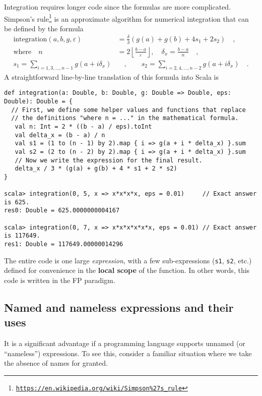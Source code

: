 Integration requires longer code since the formulas are more complicated.
Simpson's rule\footnote{\texttt{\href{https://en.wikipedia.org/wiki/Simpson\%27s_rule}{https://en.wikipedia.org/wiki/Simpson\%27s\_rule}}}
is an approximate algorithm for numerical integration that can be
defined by the formula
\begin{align*}
\text{integration}\left(a,b,g,\varepsilon\right) & =\frac{\delta}{3}\left(g(a)+g(b)+4s_{1}+2s_{2}\right)\quad,\\
\text{where }~~~n & =2\left\lfloor \frac{b-a}{\varepsilon}\right\rfloor ,\quad\delta_{x}=\frac{b-a}{n}\quad,\\
s_{1}=\sum_{i=1,3,...,n-1}g(a+i\delta_{x}) & \quad,\quad\quad s_{2}=\sum_{i=2,4,...,n-2}g(a+i\delta_{x})\quad.
\end{align*}
 A straightforward line-by-line translation of this formula into Scala
is
\begin{lstlisting}
def integration(a: Double, b: Double, g: Double => Double, eps: Double): Double = {
  // First, we define some helper values and functions that replace
  // the definitions "where n = ..." in the mathematical formula.
   val n: Int = 2 * ((b - a) / eps).toInt
   val delta_x = (b - a) / n
   val s1 = (1 to (n - 1) by 2).map { i => g(a + i * delta_x) }.sum
   val s2 = (2 to (n - 2) by 2).map { i => g(a + i * delta_x) }.sum
   // Now we write the expression for the final result.
   delta_x / 3 * (g(a) + g(b) + 4 * s1 + 2 * s2)
}

scala> integration(0, 5, x => x*x*x*x, eps = 0.01)     // Exact answer is 625.
res0: Double = 625.0000000004167

scala> integration(0, 7, x => x*x*x*x*x*x, eps = 0.01) // Exact answer is 117649.
res1: Double = 117649.00000014296
\end{lstlisting}

The entire code is one large \emph{expression}, with a few sub-expressions
(\lstinline!s1!, \lstinline!s2!, etc.) defined for convenience in
the \textbf{local scope} of the function. In other
words, this code is written in the FP paradigm.

\subsection{Named and nameless expressions and their uses}

It is a significant advantage if a programming language supports unnamed
(or ``nameless'') expressions. To see this, consider a familiar
situation where we take the absence of names for granted.

